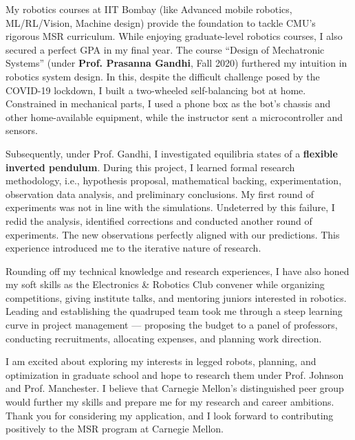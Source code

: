 \documentclass[12pt]{article}
\begin{document}
My robotics courses at IIT Bombay (like Advanced mobile robotics, ML/RL/Vision, Machine design) provide the foundation to tackle CMU’s rigorous MSR curriculum. While enjoying graduate-level robotics courses, I also secured a perfect GPA in my final year. The course “Design of Mechatronic Systems” (under \textbf{Prof. Prasanna Gandhi}, Fall 2020) furthered my intuition in robotics system design. In this, despite the difficult challenge posed by the COVID-19 lockdown, I built a two-wheeled self-balancing bot at home. Constrained in mechanical parts, I used a phone box as the bot’s chassis and other home-available equipment, while the instructor sent a microcontroller and sensors.

Subsequently, under Prof. Gandhi, I investigated equilibria states of a \textbf{flexible inverted pendulum}. During this project, I learned formal research methodology, i.e., hypothesis proposal, mathematical backing, experimentation, observation data analysis, and preliminary conclusions. My first round of experiments was not in line with the simulations. Undeterred by this failure, I redid the analysis, identified corrections and conducted another round of experiments. The new observations perfectly aligned with our predictions. This experience introduced me to the iterative nature of research.

Rounding off my technical knowledge and research experiences, I have also honed my soft skills as the Electronics \& Robotics Club convener while organizing competitions, giving institute talks, and mentoring juniors interested in robotics. Leading and establishing the quadruped team took me through a steep learning curve in project management — proposing the budget to a panel of professors, conducting recruitments, allocating expenses, and planning work direction.

I am excited about exploring my interests in legged robots, planning, and optimization in graduate school and hope to research them under Prof. Johnson and Prof. Manchester. I believe that Carnegie Mellon’s distinguished peer group would further my skills and prepare me for my research and career ambitions. Thank you for considering my application, and I look forward to contributing positively to the MSR program at Carnegie Mellon.




\setlength{\parskip}{0pt plus1pt}
\end{document}

